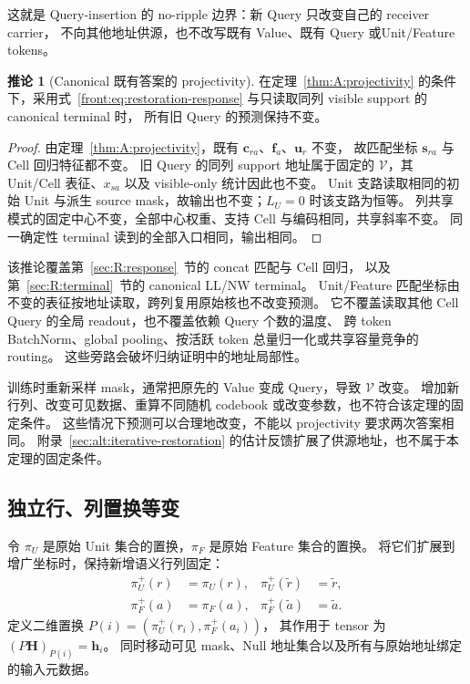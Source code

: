 \documentclass[11pt,UTF8,fontset=fandol]{ctexart}
\numberwithin{equation}{section}
\theoremstyle{definition}
\newtheorem{corollary}[definition]{推论}
\newcommand{\Vset}{\mathcal V}
\newcommand{\Fstar}{\widetilde r}
\newcommand{\Ustar}{\widetilde a}
\begin{document}
这就是 Query-insertion 的 no-ripple 边界：新 Query 只改变自己的 receiver carrier，
不向其他地址供源，也不改写既有 Value、既有 Query 或Unit/Feature tokens。

\begin{corollary}[Canonical 既有答案的 projectivity]
\label{cor:A:answer-projectivity}
在定理~\ref{thm:A:projectivity} 的条件下，采用式~\eqref{front:eq:restoration-response}
与只读取同列 visible support 的 canonical terminal 时，
所有旧 Query 的预测保持不变。
\end{corollary}
\begin{proof}
由定理~\ref{thm:A:projectivity}，既有 $\bm c_{ra}$、$\bm f_a$、$\bm u_r$ 不变，
故匹配坐标 $\bm s_{ra}$ 与 Cell 回归特征都不变。
旧 Query 的同列 support 地址属于固定的 $\Vset$，其 Unit/Cell 表征、$x_{sa}$
以及 visible-only 统计因此也不变。
Unit 支路读取相同的初始 Unit 与派生 source mask，故输出也不变；$L_U=0$ 时该支路为恒等。
列共享模式的固定中心不变，全部中心权重、支持 Cell 与编码相同，共享斜率不变。
同一确定性 terminal 读到的全部入口相同，输出相同。
\end{proof}

该推论覆盖第~\ref{sec:R:response}~节的 concat 匹配与 Cell 回归，
以及第~\ref{sec:R:terminal}~节的 canonical LL/NW terminal。
Unit/Feature 匹配坐标由不变的表征按地址读取，跨列复用原始核也不改变预测。
它不覆盖读取其他 Cell Query 的全局 readout，也不覆盖依赖 Query 个数的温度、
跨 token BatchNorm、global pooling、按活跃 token 总量归一化或共享容量竞争的 routing。
这些旁路会破坏归纳证明中的地址局部性。

训练时重新采样 mask，通常把原先的 Value 变成 Query，导致 $\Vset$ 改变。
增加新行列、改变可见数据、重算不同随机 codebook 或改变参数，也不符合该定理的固定条件。
这些情况下预测可以合理地改变，不能以 projectivity 要求两次答案相同。
附录~\ref{sec:alt:iterative-restoration} 的估计反馈扩展了供源地址，也不属于本定理的固定条件。

\subsection{独立行、列置换等变}
\label{subsec:A:permutation}

令 $\pi_U$ 是原始 Unit 集合的置换，$\pi_F$ 是原始 Feature 集合的置换。
将它们扩展到增广坐标时，保持新增语义行列固定：
\begin{equation}
 \begin{aligned}
  \pi_U^+(r)&=\pi_U(r),
  &\pi_U^+(\Fstar)&=\Fstar,\\
  \pi_F^+(a)&=\pi_F(a),
  &\pi_F^+(\Ustar)&=\Ustar.
 \end{aligned}
 \label{eq:A:extended-permutation}
\end{equation}
定义二维置换 $P(i)=(\pi_U^+(r_i),\pi_F^+(a_i))$，
其作用于 tensor 为 $(P\bm H)_{P(i)}=\bm h_i$。
同时移动可见 mask、Null 地址集合以及所有与原始地址绑定的输入元数据。
\end{document}
